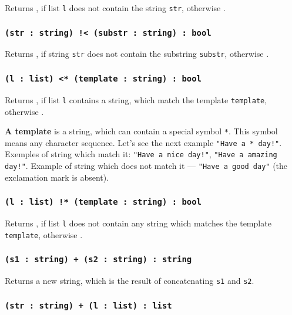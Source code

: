 Returns \true{}, if list \texttt{l} does not contain the string \texttt{str}, otherwise \false{}.

\subsubsection{\texttt{(str : string) !< (substr : string) : bool}}

Returns \true{}, if string \texttt{str} does not contain the substring \texttt{substr}, otherwise \false{}.

\subsubsection{\texttt{(l : list) <* (template : string) : bool}}

Returns \true{}, if list \texttt{l} contains a string, which match the template \texttt{template}, otherwise \false{}.

{\bf A template} is a string, which can contain a special symbol \texttt{*}. This symbol means any character sequence. Let's see the next example \texttt{"Have a * day!"}. Exemples of string which match it: \texttt{"Have a nice day!"}, \texttt{"Have a amazing day!"}. Example of string which does not match it — \texttt{"Have a good day"} (the exclamation mark is absent).

\subsubsection{\texttt{(l : list) !* (template : string) : bool}}

Returns \true{}, if list \texttt{l} does not contain any string which matches the template \texttt{template}, otherwise \false{}.

\subsubsection{\texttt{(s1 : string) + (s2 : string) : string}}

Returns a new string, which is the result of concatenating \texttt{s1} and \texttt{s2}.

\subsubsection{\texttt{(str : string) + (l : list) : list}}

